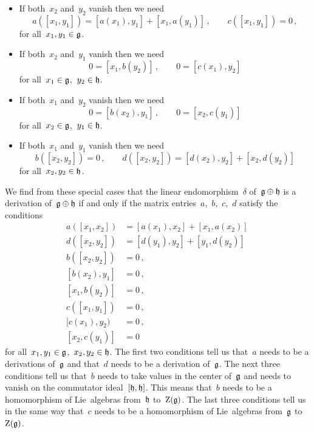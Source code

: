 \begin{example}
  \begin{itemize}
    \item
      If both~$x_2$ and~$y_2$ vanish then we need
      \[
        a( [x_1, y_1] )
        =
        [a(x_1), y_1] + [x_1, a(y_1)] \,,
        \qquad
        c( [x_1, y_1] )
        =
        0 \,,
      \]
      for all~$x_1, y_1 \in \mathfrak{g}$.
    \item
      If both~$x_2$ and~$y_1$ vanish then we need
      \[
        0
        =
        [ x_1, b(y_2) ] \,,
        \qquad
        0
        =
        [ c(x_1), y_2 ]
      \]
      for all~$x_1 \in \mathfrak{g}$,~$y_2 \in \mathfrak{h}$.
    \item
      If both~$x_1$ and~$y_2$ vanish then we need
      \[
        0
        =
        [ b(x_2), y_1 ] \,,
        \qquad
        0
        =
        [ x_2, c(y_1) ]
      \]
      for all~$x_2 \in \mathfrak{g}$,~$y_1 \in \mathfrak{h}$.
    \item
      If both~$x_1$ and~$y_1$ vanish then we need
      \[
        b( [x_2, y_2] )
        =
        0 \,,
        \qquad
        d( [x_2, y_2] )
        =
        [ d(x_2), y_2 ] + [ x_2, d(y_2) ]
      \]
      for all~$x_2, y_2 \in \mathfrak{h}$.
  \end{itemize}
  We find from these special cases that the linear endomorphism~$\delta$ of~$\mathfrak{g} \oplus \mathfrak{h}$ is a derivation of~$\mathfrak{g} \oplus \mathfrak{h}$ if and only if the matrix entries~$a$,~$b$,~$c$,~$d$ satisfy the conditions
  \begin{align*}
    a( [x_1, x_2] ) &= [ a(x_1), x_2 ] + [ x_1, a(x_2) ] \,\\
    d( [x_2, y_2] ) &= [ d(y_1), y_2 ] + [ y_1, d(y_2) ] \,\\
    b( [x_2, y_2] ) &= 0 \,, \\
    [ b(x_2), y_1]  &= 0 \,, \\
    [ x_1, b(y_2) ] &= 0 \,, \\
    c( [x_1, y_1] ) &= 0 \,, \\
    [ c(x_1), y_2 ) &= 0 \,, \\
    [ x_2, c(y_1) ] &= 0
  \end{align*}
  for all~$x_1, y_1 \in \mathfrak{g}$,~$x_2, y_2 \in \mathfrak{h}$.
  The first two conditions tell us that~$a$ needs to be a derivations of~$\mathfrak{g}$ and that~$d$ needs to be a derivation of~$\mathfrak{g}$.
  The next three conditions tell us that~$b$ needs to take values in the center of~$\mathfrak{g}$ and needs to vanish on the commutator ideal~$[\mathfrak{h}, \mathfrak{h}]$.
  This means that~$b$ needs to be a homomorphism of Lie~algebras from~$\mathfrak{h}$ to~$\operatorname{Z}(\mathfrak{g})$.
  The last three conditions tell us in the same way that~$c$ needs to be a homomorphism of Lie~algebras from~$\mathfrak{g}$ to~$\operatorname{Z}(\mathfrak{g})$.


\end{example}
